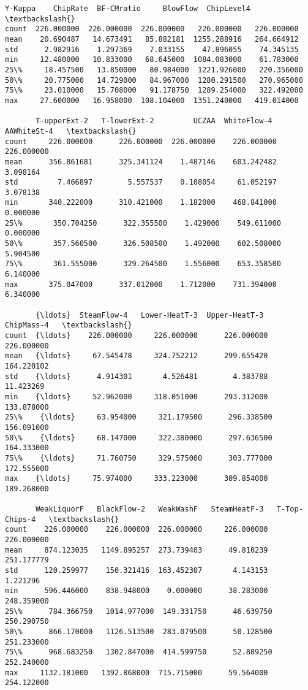 \documentclass[11pt]{article}
\makeatletter
\newcommand{\boxspacing}{\kern\kvtcb@left@rule\kern\kvtcb@boxsep}
\newcommand{\prompt}[4]{
        {\ttfamily\llap{{\color{#2}[#3]:\hspace{3pt}#4}}\vspace{-\baselineskip}}
    }
\makeatother
\begin{document}
            \begin{tcolorbox}[breakable, size=fbox, boxrule=.5pt, pad at break*=1mm, opacityfill=0]
\prompt{Out}{outcolor}{22}{\boxspacing}
\begin{Verbatim}[commandchars=\\\{\}]
          Y-Kappa    ChipRate  BF-CMratio     BlowFlow  ChipLevel4   \textbackslash{}
count  226.000000  226.000000  226.000000   226.000000   226.000000
mean    20.690487   14.673491   85.882181  1255.288916   264.664912
std      2.982916    1.297369    7.033155    47.896055    74.345135
min     12.480000   10.833000   68.645000  1084.083000    61.783000
25\%     18.457500   13.850000   80.984000  1221.926000   220.356000
50\%     20.775000   14.729000   84.967000  1280.291500   270.965000
75\%     23.010000   15.708000   91.178750  1289.254000   322.492000
max     27.600000   16.958000  108.104000  1351.240000   419.014000

       T-upperExt-2   T-lowerExt-2         UCZAA  WhiteFlow-4   AAWhiteSt-4   \textbackslash{}
count     226.000000      226.000000  226.000000    226.000000    226.000000
mean      356.861681      325.341124    1.487146    603.242482      3.098164
std         7.466897        5.557537    0.108054     61.052197      3.078138
min       340.222000      310.421000    1.182000    468.841000      0.000000
25\%       350.704250      322.355500    1.429000    549.611000      0.000000
50\%       357.560500      326.508500    1.492000    602.508000      5.904500
75\%       361.555000      329.264500    1.556000    653.358500      6.140000
max       375.047000      337.012000    1.712000    731.394000      6.340000

       {\ldots}  SteamFlow-4   Lower-HeatT-3  Upper-HeatT-3   ChipMass-4   \textbackslash{}
count  {\ldots}    226.000000     226.000000      226.000000   226.000000
mean   {\ldots}     67.545478     324.752212      299.655420   164.220102
std    {\ldots}      4.914301       4.526481        4.383788    11.423269
min    {\ldots}     52.962000     318.051000      293.312000   133.878000
25\%    {\ldots}     63.954000     321.179500      296.338500   156.091000
50\%    {\ldots}     68.147000     322.380000      297.636500   164.333000
75\%    {\ldots}     71.760750     329.575000      303.777000   172.555000
max    {\ldots}     75.974000     333.223000      309.854000   189.268000

       WeakLiquorF   BlackFlow-2   WeakWashF   SteamHeatF-3   T-Top-Chips-4   \textbackslash{}
count    226.000000    226.000000  226.000000     226.000000      226.000000
mean     874.123035   1149.895257  273.739403      49.810239      251.177779
std      120.259977    150.321416  163.452307       4.143153        1.221296
min      596.446000    838.948000    0.000000      38.283000      248.359000
25\%      784.366750   1014.977000  149.331750      46.639750      250.290750
50\%      866.170000   1126.513500  283.079500      50.128500      251.233000
75\%      968.683250   1302.847000  414.599750      52.889250      252.240000
max     1132.181000   1392.868000  715.715000      59.564000      254.122000


\end{Verbatim}
\end{tcolorbox}
\end{document}
